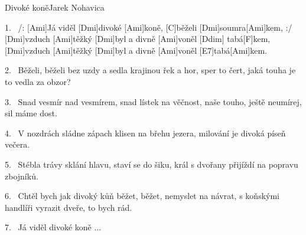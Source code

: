 \begin{song}{Divoké koně}{Jarek Nohavica}

\begin{xverse}{1.~}
/: [\large Ami]Já viděl [\large Dmi]divoké [\large Ami]koně, [\large C]běželi [\large Dmi]soumra[\large Ami]kem, :/
[\large Dmi]vzduch [\large Ami]těžký [\large Dmi]byl a divně [\large Ami]voněl [\large Ddim]{\,\,}tabá[\large F]kem,
[\large Dmi]vzduch [\large Ami]těžký [\large Dmi]byl a divně [\large Ami]voněl [\large E7]tabá[\large Ami]kem.
\end{xverse}

\begin{xverse}{2.~}
Běželi, běželi bez uzdy a sedla krajinou řek a hor,
sper to čert, jaká touha je to vedla za obzor?
\end{xverse}

\begin{xverse}{3.~}
Snad vesmír nad vesmírem, snad lístek na věčnost,
naše touho, ještě neumírej, sil máme dost.
\end{xverse}

\begin{xverse}{4.~}
V nozdrách sládne zápach klisen na břehu jezera,
milování je divoká píseň večera.
\end{xverse}

\begin{xverse}{5.~}
Stébla trávy sklání hlavu, staví se do šiku,
král s dvořany přijíždí na popravu zbojníků.
\end{xverse}

\begin{xverse}{6.~}
Chtěl bych jak divoký kůň běžet, běžet, nemyslet na návrat,
s koňskými handlíři vyrazit dveře, to bych rád.
\end{xverse}

\begin{xverse}{7.~}
Já viděl divoké koně ...
\end{xverse}

\end{song}
\chords{\chordAdim}

